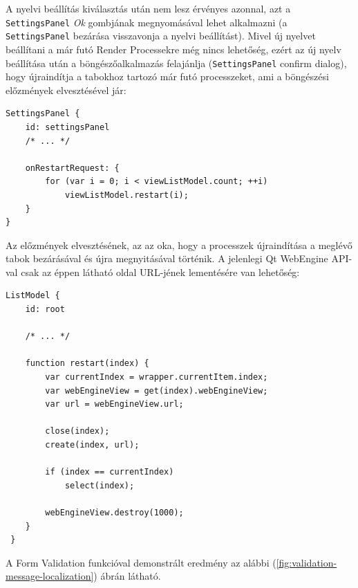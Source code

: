 \documentclass[12pt]{report}
\begin{document}
\noindent
A nyelvi beállítás kiválasztás után nem lesz érvényes azonnal, azt a \texttt{SettingsPanel}
\textit{Ok} gombjának megnyomásával lehet alkalmazni (a \texttt{SettingsPanel} bezárása
visszavonja a nyelvi beállítást). Mivel új nyelvet beállítani a már futó Render Processekre
még nincs lehetőség, ezért az új nyelv beállítása után a böngészőalkalmazás felajánlja
(\texttt{SettingsPanel} confirm dialog), hogy újraindítja a tabokhoz tartozó már futó
processzeket, ami a böngészési előzmények elvesztésével jár:
\begin{lstlisting}[title=main.qml]
SettingsPanel {
    id: settingsPanel
    /* ... */

    onRestartRequest: {
        for (var i = 0; i < viewListModel.count; ++i)
            viewListModel.restart(i);
    }
}
\end{lstlisting}

Az előzmények elvesztésének, az az oka, hogy a processzek újraindítása a meglévő tabok
bezárásával és újra megnyitásával történik. A jelenlegi Qt WebEngine API-val csak az éppen
látható oldal URL-jének lementésére van lehetőség:
\begin{lstlisting}[title=models/WebEngineViewListModel.qml]
ListModel {
    id: root

    /* ... */

    function restart(index) {
        var currentIndex = wrapper.currentItem.index;
        var webEngineView = get(index).webEngineView;
        var url = webEngineView.url;

        close(index);
        create(index, url);

        if (index == currentIndex)
            select(index);

        webEngineView.destroy(1000);
    }
 }
\end{lstlisting}

A Form Validation funkcióval demonstrált eredmény az alábbi
(\ref{fig:validation-message-localization}) ábrán látható.
\end{document}
